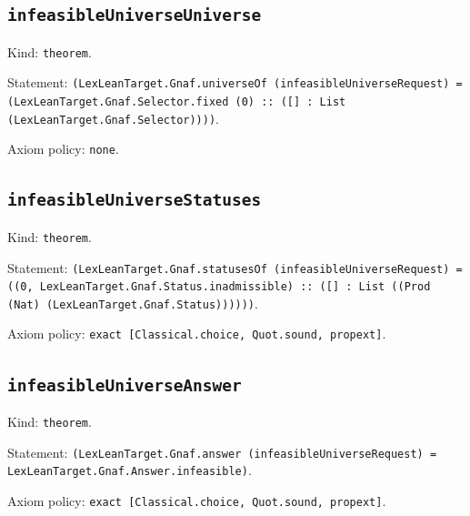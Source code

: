 \documentclass[11pt]{article}
\begin{document}
\subsection*{\texttt{infeasibleUniverseUniverse}}
\noindent Kind: \texttt{theorem}.\par
\noindent Statement: \texttt{(LexLeanTarget.Gnaf.universeOf (infeasibleUniverseRequest) = (LexLeanTarget.Gnaf.Selector.fixed (0) :: ([] : List (LexLeanTarget.Gnaf.Selector))))}.\par
\noindent Axiom policy: \texttt{none}.\par
\subsection*{\texttt{infeasibleUniverseStatuses}}
\noindent Kind: \texttt{theorem}.\par
\noindent Statement: \texttt{(LexLeanTarget.Gnaf.statusesOf (infeasibleUniverseRequest) = ((0, LexLeanTarget.Gnaf.Status.inadmissible) :: ([] : List ((Prod (Nat) (LexLeanTarget.Gnaf.Status))))))}.\par
\noindent Axiom policy: \texttt{exact [Classical.choice, Quot.sound, propext]}.\par
\subsection*{\texttt{infeasibleUniverseAnswer}}
\noindent Kind: \texttt{theorem}.\par
\noindent Statement: \texttt{(LexLeanTarget.Gnaf.answer (infeasibleUniverseRequest) = LexLeanTarget.Gnaf.Answer.infeasible)}.\par
\noindent Axiom policy: \texttt{exact [Classical.choice, Quot.sound, propext]}.\par
\end{document}
